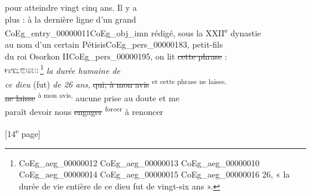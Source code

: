 \documentclass{book}
\begin{document}
{\begin{paracol}{2}
pour atteindre vingt cinq ans. Il y a\\
plus : à la dernière ligne d’un grand\\
\gls{CoEg_entry_00000011}\gls{CoEg_obj_imn} rédigé, sous la XXII\textsuperscript{e} dynastie\\
au nom d’un certain Pétisis\gls{CoEg_pers_00000183}, petit-fils\\
du roi Osorkon II\gls{CoEg_pers_00000195}, on lit \sout{cette phrase} :\\
\includegraphics[height=6pt]{CoEg_Mariette_hiero_1857-04-01_13.png} \footnote{\foreignlanguage{translit}{\Gls{CoEg_aeg_00000012} \gls{CoEg_aeg_00000013} \gls{CoEg_aeg_00000010} \gls{CoEg_aeg_00000014} \gls{CoEg_aeg_00000015} \gls{CoEg_aeg_00000016} 26}, « la durée de vie entière de ce dieu fut de vingt-six ans ».} \textit{la durée humaine de\\
ce dieu} (fut) \textit{de 26 ans}, \sout{qui, à mon avis} \textsuperscript{et cette phrase ne laisse,}\\
\sout{ne laisse} \textsuperscript{à mon avis,} aucune prise au doute et me\\
paraît devoir nous \sout{engager} \textsuperscript{forcer} à renoncer
\end{paracol}

{\footnotesize\begin{center} {[14\textsuperscript{e} page]}\end{center}}

}
\end{document}
